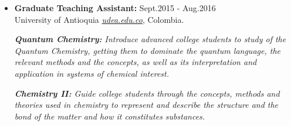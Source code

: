 \begin{itemize}

    \item {\bf Graduate Teaching Assistant:}\hfill
          \textcolor{my_blue}{Sept.2015 - Aug.2016}\\
          {University of Antioquia
              {\href{www.udea.edu.co}{\textcolor{my_blue}{\em udea.edu.co}}}, Colombia.}

          \emph{\textbf{Quantum Chemistry:} Introduce advanced college
              students to study of the Quantum Chemistry, getting them to dominate the
              quantum language, the relevant methods and the concepts, as well as its
              interpretation and application in systems of chemical interest.}

          \emph{\textbf{Chemistry II:} Guide college students through the
              concepts, methods and theories used in chemistry to represent and describe the
              structure and the bond of the matter and how it constitutes substances. }
\end{itemize}
